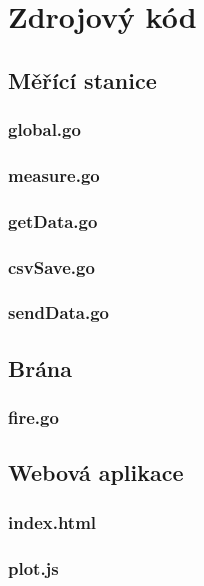\chapter{Zdrojový kód}
\section{Měřící stanice}
\subsection{global.go}

\subsection{measure.go}

\subsection{getData.go}

\subsection{csvSave.go}

\subsection{sendData.go}

\section{Brána}
\subsection{fire.go}

\section{Webová aplikace}
\subsection{index.html}

\subsection{plot.js}

